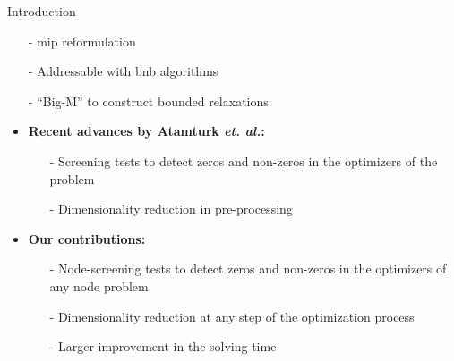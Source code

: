 \documentclass[final]{beamer}
\newlength{\onecolwid}
\newcommand{\emphone}[1]{{\color{norange}#1}}
\begin{document}
\begin{frame}[t]
\begin{columns}[t]
\begin{column}{\onecolwid}
\begin{block}{Introduction}
\begin{itemize}
\begin{itemize}
                \item[-] \hspace*{0.1em} \glsdesc{mip} reformulation
                \item[-] \hspace*{0.1em} Addressable with \gls{bnb} algorithms  
                \item[-] \hspace*{0.1em} ``Big-M'' to construct bounded relaxations
            \end{itemize}
        \end{itemize}

        \begin{itemize}
            \item \hspace*{0.1em} \textbf{Recent advances by Atamturk \textit{et. al.}:}
            \begin{itemize}
                \normalsize \justifying \item[-] \hspace*{0.1em} \emphone{Screening tests} to detect zeros and non-zeros in the optimizers of the problem
                \item[-] \hspace*{0.1em} Dimensionality reduction in \emphone{pre-processing}
            \end{itemize}
        \end{itemize}

        \begin{itemize}
            \item \hspace*{0.1em} \textbf{Our contributions:}
            \begin{itemize}
                \normalsize \justifying \item[-] \hspace*{0.1em} \emphone{Node-screening tests} to detect zeros and non-zeros in the optimizers of \emphone{any node} problem
                \item[-] \hspace*{0.05em} Dimensionality reduction at \emphone{any step} of the optimization process
                \item[-] \hspace*{0.05em} Larger improvement in the solving time
            \end{itemize}
        \end{itemize}
    \end{block}
\end{column}


\end{columns}
\end{frame}
\end{document}
